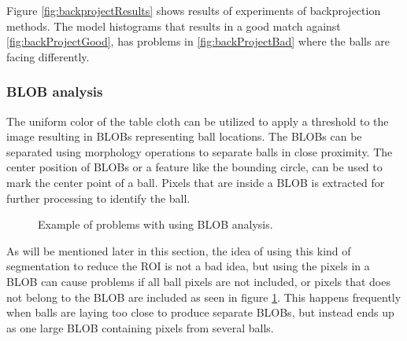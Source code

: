 Figure \ref{fig:backprojectResults} shows results of experiments of backprojection methods. The model histograms that results in a good match against \ref{fig:backProjectGood}, has problems in \ref{fig:backProjectBad} where the balls are facing differently.

\subsubsection{BLOB analysis}
The uniform color of the table cloth can be utilized to apply a threshold to the image resulting in BLOBs representing ball locations. The BLOBs can be separated using morphology operations to separate balls in close proximity. The center position of BLOBs or a feature like the bounding circle, can be used to mark the center point of a ball. Pixels that are inside a BLOB is extracted for further processing to identify the ball.
\begin{figure}[H]
  \centering
  \quad           
   \caption{Example of problems with using BLOB analysis.}
  \label{fig:blobAnal}
\end{figure}
As will be mentioned later in this section, the idea of using this kind of segmentation to reduce the ROI is not a bad idea, but using the pixels in a BLOB can cause problems if all ball pixels are not included, or pixels that does not belong to the BLOB are included as seen in figure \ref{fig:blobAnal}. This happens frequently when balls are laying too close to produce separate BLOBs, but instead ends up as one large BLOB containing pixels from several balls.

